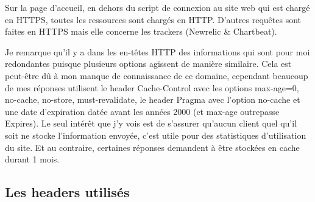 \documentclass[conference]{IEEEtran}
\begin{document}
Sur la page d'accueil, en dehors du script de connexion au site web qui est chargé en HTTPS, toutes les ressources sont chargés en HTTP. D'autres requêtes sont faites en HTTPS mais elle concerne les trackers (Newrelic \& Chartbeat).

Je remarque qu'il y a dans les en-têtes HTTP des informations qui sont pour moi redondantes puisque plusieurs options agissent de manière similaire. Cela est peut-être dû à mon manque de connaissance de ce domaine, cependant beaucoup de mes réponses utilisent le header Cache-Control avec les options max-age=0, no-cache, no-store, must-revalidate, le header Pragma avec l'option no-cache et une date d'expiration datée avant les années 2000 (et max-age outrepasse Expires). Le seul intérêt que j'y vois est de s'assurer qu'aucun client quel qu'il soit ne stocke l'information envoyée, c'est utile pour des statistiques d'utilisation du site. Et au contraire, certaines réponses demandent à être stockées en cache durant 1 mois. 

\subsection{Les headers utilisés}
\end{document}
